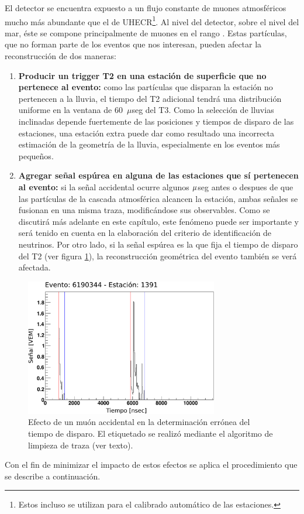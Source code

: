 		El detector se encuentra expuesto a un flujo constante de muones atmosféricos mucho más abundante que el de UHECR\footnote{Estos incluso se utilizan para el calibrado automático de las estaciones.}. 
		Al nivel del detector,  sobre el nivel del mar, éste se compone principalmente de muones en el rango . 
		Estas partículas, que no forman parte de los eventos que nos interesan, pueden afectar la reconstrucción de dos maneras:
		\begin{enumerate}
		\item \textbf{Producir un trigger T2 en una estación de superficie que no pertenece al evento:} como las partículas que disparan la estación no pertenecen a la lluvia, el tiempo del T2 adicional tendrá una distribución uniforme en la ventana de 60~$\mu$seg del T3. Como la selección de lluvias inclinadas depende fuertemente de las posiciones y tiempos de disparo de las estaciones, una estación extra puede dar como resultado una incorrecta estimación de la geometría de la lluvia, especialmente en los eventos más pequeños.

		\item \textbf{Agregar señal espúrea en alguna de las estaciones que sí pertenecen al evento:} si la señal accidental ocurre algunos $\rm\mu$seg antes o despues de que las partículas de la cascada atmosférica alcancen la estación, ambas señales se fusionan en una misma traza, modificándose sus observables.
		Como se discutirá más adelante en este capítulo, este fen\'omeno puede ser importante y será tenido en cuenta en la elaboración del criterio de identificación de neutrinos. 
		Por otro lado, si la señal espúrea es la que fija el tiempo de disparo del T2 (ver figura \ref{fig:trazaMalTiempo}), la reconstrucción geométrica del evento también se verá afectada.
		\end{enumerate}
		\begin{figure}[ht]
		\begin{center}
		\includegraphics[width=0.75\textwidth]{fig/seleccionAuger/badStartTime.pdf}
		\caption{Efecto de un muón accidental en la determinación errónea del tiempo de disparo. El etiquetado se realizó mediante el algoritmo de limpieza de traza (ver texto).}
		\label{fig:trazaMalTiempo}
		\end{center}
		\end{figure}
		Con el fin de minimizar el impacto de estos efectos se aplica el procedimiento que se describe a continuaci\'on.
		
